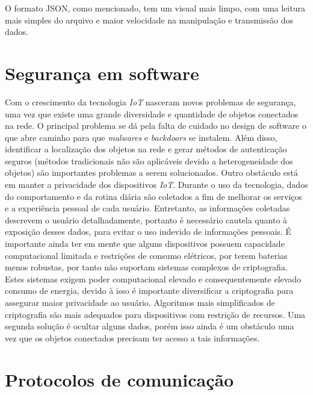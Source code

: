 \documentclass[../../layout.tex]{subfiles}
\begin{document}
O formato JSON, como mencionado, tem um visual mais limpo, com uma leitura mais simples do arquivo e maior velocidade na manipulação e transmissão dos dados.

\section{Segurança em software}
\hspace*{3em}Com o crescimento da tecnologia \emph{IoT} nasceram novos problemas de segurança, uma vez que existe uma grande diversidade e quantidade de objetos conectados na rede. O principal problema se dá pela falta de cuidado no design de software o que abre caminho para que \emph{malwares} e \emph{backdoors} se instalem. Além disso, identificar a localização dos objetos na rede e gerar métodos de autenticação seguros (métodos tradicionais não são aplicáveis devido a heterogeneidade dos objetos) são importantes problemas a serem solucionados. Outro obstáculo está em manter a privacidade dos dispositivos \emph{IoT}. Durante o uso da tecnologia, dados do comportamento e da rotina diária são coletados a fim de melhorar os serviços e a experiência pessoal de cada usuário. Entretanto, as informações coletadas descrevem o usuário detalhadamente, portanto é necessário cautela quanto à exposição desses dados, para evitar o uso indevido de informações pessoais. 
É importante ainda ter em mente que alguns dispositivos possuem capacidade computacional limitada e restrições de consumo elétricos, por terem baterias menos robustas, por tanto não suportam  sistemas complexos de criptografia. Estes sistemas exigem poder computacional elevado e consequentemente elevado consumo de energia, devido à isso é importante diversificar a criptografia para assegurar maior privacidade ao usuário. Algoritmos mais simplificados de criptografia são mais adequados para dispositivos com restrição de recursos. Uma segunda solução é ocultar alguns dados, porém isso ainda é um obstáculo uma vez que os objetos conectados precisam ter acesso a tais informações. \cite{seguranca}

\section{Protocolos de comunicação}
\end{document}
